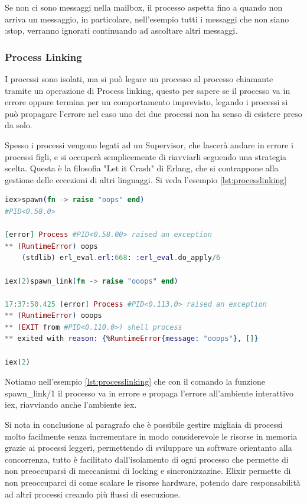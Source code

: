 Se non ci sono messaggi nella mailbox, il processo aspetta fino a
quando non arriva un messaggio, in particolare, 
nell'esempio tutti i messaggi che
non siano :stop, verranno ignorati continuando ad ascoltare altri
messaggi.

\subsubsection{Process Linking}

I processi sono isolati, ma si può legare un processo
al processo chiamante tramite un operazione di Process linking,
questo per sapere se il processo va in errore
oppure termina per un comportamento imprevisto,
legando i processi si può propagare l'errore nel caso
uno dei due processi non ha senso di esistere preso da solo.

Spesso i processi vengono legati ad un Supervisor, che
lascerà andare in errore i processi figli, e si occuperà
semplicemente di riavviarli seguendo una strategia scelta.
Questa è la filosofia "Let it Crash"
di Erlang, che si contrappone alla gestione delle eccezioni
di altri linguaggi. Si veda l'esempio \ref{lst:processlinking}

\begin{lstlisting}[language=elixir, caption={Process linking},captionpos=b,
	label={lst:processlinking}]
iex>spawn(fn -> raise "oops" end)
#PID<0.58.0>
	
[error] Process #PID<0.58.00> raised an exception
** (RuntimeError) oops
	(stdlib) erl_eval.erl:668: :erl_eval.do_apply/6

iex(2)spawn_link(fn -> raise "ooops" end)

17:37:50.425 [error] Process #PID<0.113.0> raised an exception
** (RuntimeError) ooops
** (EXIT from #PID<0.110.0>) shell process 
** exited with reason: {%RuntimeError{message: "ooops"}, []}

iex(2)
\end{lstlisting}

Notiamo nell'esempio \ref{lst:processlinking} che con il comando
la funzione spawn\_link/1 il processo va in errore e propaga
l'errore all'ambiente interattivo iex, riavviando anche
l'ambiente iex.

Si nota in conclusione al paragrafo che è possibile
gestire migliaia di processi molto facilmente senza
incrementare in modo considerevole le risorse in memoria grazie
ai processi leggeri, permettendo
di sviluppare un software orientanto alla concorrenza,
tutto è facilitato dall'isolamento di ogni processo che 
permette di non preoccuparsi di meccanismi di locking e sincronizzazine.
Elixir permette di non preoccuparci di come scalare
le risorse hardware, potendo dare responsabilità ad altri
processi creando più flussi di esecuzione.